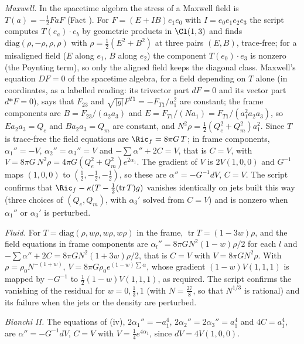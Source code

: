 \emph{Maxwell.} In the spacetime algebra the stress of a Maxwell field is $T(a) = -\tfrac12 FaF$ (Fact ). For $F = (E + IB)e_{1}e_{0}$ with $I = e_{0}e_{1}e_{2}e_{3}$ the script computes $T(e_{a})\cdot e_{b}$ by geometric products in $\Cl(1,3)$ and finds $\mathrm{diag}(\rho, -\rho, \rho, \rho)$ with $\rho = \tfrac12(E^{2} + B^{2})$ at three pairs $(E, B)$, trace-free; for a misaligned field ($E$ along $e_{1}$, $B$ along $e_{2}$) the component $T(e_{0})\cdot e_{3}$ is nonzero (the Poynting term), so only the aligned field keeps the diagonal class. Maxwell's equation $DF = 0$ of the spacetime algebra, for a field depending on $T$ alone (in coordinates, as a labelled reading: its trivector part $dF = 0$ and its vector part $d{*F} = 0$), says that $F_{23}$ and $\sqrt{|g|}F^{T1} = -F_{T1}/a_{1}^{2}$ are constant; the frame components are $B = F_{23}/(a_{2}a_{3})$ and $E = F_{T1}/(Na_{1}) = F_{T1}/(a_{1}^{2}a_{2}a_{3})$, so $Ea_{2}a_{3} = Q_{e}$ and $Ba_{2}a_{3} = Q_{m}$ are constant, and $N^{2}\rho = \tfrac12(Q_{e}^{2} + Q_{m}^{2})a_{1}^{2}$. Since $T$ is trace-free the field equations are $\Ric_{f} = 8\pi G\,T$; in frame components, $\alpha_{1}'' = -V$, $\alpha_{2}'' = \alpha_{3}'' = V$ and $-\sum\alpha'' + 2C = V$, that is $C = V$, with $V = 8\pi G\,N^{2}\rho = 4\pi G(Q_{e}^{2} + Q_{m}^{2})e^{2\alpha_{1}}$. The gradient of $V$ is $2V(1, 0, 0)$ and $G^{-1}$ maps $(1, 0, 0)$ to $(\tfrac12, -\tfrac12, -\tfrac12)$, so these are $\alpha'' = -G^{-1}dV$, $C = V$. The script confirms that $\Ric_{f} - \kappa(T - \tfrac12(\operatorname{tr}T)g)$ vanishes identically on jets built this way (three choices of $(Q_{e}, Q_{m})$, with $\alpha_{3}'$ solved from $C = V$) and is nonzero when $\alpha_{1}''$ or $\alpha_{3}'$ is perturbed.

\emph{Fluid.} For $T = \mathrm{diag}(\rho, w\rho, w\rho, w\rho)$ in the frame, $\operatorname{tr}T = (1 - 3w)\rho$, and the field equations in frame components are $\alpha_{l}'' = 8\pi G N^{2}(1 - w)\rho/2$ for each $l$ and $-\sum\alpha'' + 2C = 8\pi G N^{2}(1 + 3w)\rho/2$, that is $C = V$ with $V = 8\pi GN^{2}\rho$. With $\rho = \rho_{0}N^{-(1 + w)}$, $V = 8\pi G\rho_{0}e^{(1 - w)\sum\alpha}$, whose gradient $(1 - w)V(1, 1, 1)$ is mapped by $-G^{-1}$ to $\tfrac12(1 - w)V(1, 1, 1)$, as required. The script confirms the vanishing of the residual for $w = 0, \tfrac13, 1$ (with $N = \tfrac{27}{8}$, so that $N^{1/3}$ is rational) and its failure when the jets or the density are perturbed.

\emph{Bianchi II.} The equations of (iv), $2\alpha_{1}'' = -a_{1}^{4}$, $2\alpha_{2}'' = 2\alpha_{3}'' = a_{1}^{4}$ and $4C = a_{1}^{4}$, are $\alpha'' = -G^{-1}dV$, $C = V$ with $V = \tfrac14e^{4\alpha_{1}}$, since $dV = 4V(1, 0, 0)$.

